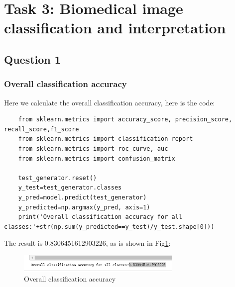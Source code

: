 \documentclass[conference]{IEEEtran}
\begin{document}
\section{Task 3: Biomedical image classification and interpretation}
\subsection{Question 1}
\subsubsection{Overall classification accuracy}
Here we calculate the overall classification accuracy, here is the code:
\begin{lstlisting}
    from sklearn.metrics import accuracy_score, precision_score, recall_score,f1_score
    from sklearn.metrics import classification_report
    from sklearn.metrics import roc_curve, auc
    from sklearn.metrics import confusion_matrix

    test_generator.reset()
    y_test=test_generator.classes
    y_pred=model.predict(test_generator)
    y_predicted=np.argmax(y_pred, axis=1)
    print('Overall classification accuracy for all classes:'+str(np.sum(y_predicted==y_test)/y_test.shape[0]))
\end{lstlisting}
The result is 0.8306451612903226, as is shown in Fig\ref{Fig.t3q1}:
\begin{figure}[H] 
    \centering %
    \includegraphics[width=0.7\textwidth]{T3Q1a.png} %
    \caption{Overall classification accuracy} %
    \label{Fig.t3q1} %
\end{figure}
\end{document}
